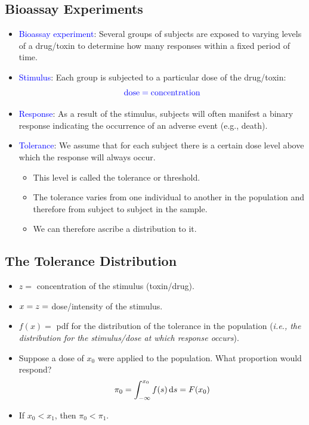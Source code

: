 \documentclass{article}\usepackage[]{graphicx}\usepackage[svgnames]{xcolor}
\let\log\relax%
\begin{document}
\subsection*{Bioassay Experiments}
\begin{itemize}
      \item \textcolor{Blue}{Bioassay experiment}: Several groups of subjects are exposed to varying levels
            of a drug/toxin to determine how many responses within a fixed period of time.
      \item \textcolor{Blue}{Stimulus}: Each group is subjected to a particular dose of the drug/toxin:
            \[ \textcolor{Blue}{\text{dose}=\log{\text{concentration}}} \]
      \item \textcolor{Blue}{Response}: As a result of the stimulus, subjects will often manifest a binary
            response indicating the occurrence of an adverse event (e.g., death).
      \item \textcolor{Blue}{Tolerance}: We assume that for each subject there is a certain dose level above
            which the response will always occur.
            \begin{itemize}
                  \item This level is called the tolerance or threshold.
                  \item The tolerance varies from one individual to another in the population and therefore
                        from subject to subject in the sample.
                  \item We can therefore ascribe a distribution to it.
            \end{itemize}
\end{itemize}
\subsection*{The Tolerance Distribution}
\begin{itemize}
      \item $ z =$ concentration of the stimulus (toxin/drug).
      \item $ x=\log{z} =$ dose/intensity of the stimulus.
      \item $ f(x)= $ pdf for the distribution of the tolerance in the population (\emph{i.e., the
                  distribution for the stimulus/dose at which response occurs}).
      \item Suppose a dose of $ x_0 $ were applied to the population. What proportion would
            respond?
            \[ \pi_0=\int_{-\infty}^{x_0}f(s)\odif{s}=F(x_0) \]
      \item If $ x_0<x_1 $, then $ \pi_0<\pi_1 $.
\end{itemize}
\end{document}
